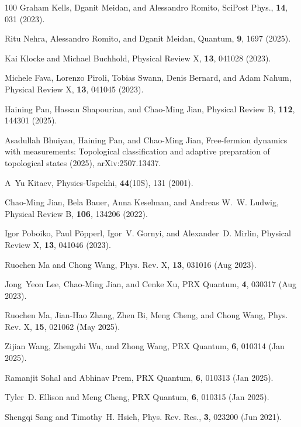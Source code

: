 \documentclass[preprint,pteplogo]{ptephy_v2}%
\numberwithin{equation}{section}
\theoremstyle{definition}
\begin{document}
\begin{thebibliography}{100}
Graham Kells, Dganit Meidan, and Alessandro Romito, SciPost Phys., {\bf 14}, 031 (2023).

Ritu Nehra, Alessandro Romito, and Dganit Meidan, Quantum, {\bf 9}, 1697 (2025).

Kai Klocke and Michael Buchhold, Physical Review X, {\bf 13}, 041028 (2023).

Michele Fava, Lorenzo Piroli, Tobias Swann, Denis Bernard, and Adam Nahum, Physical Review X, {\bf 13}, 041045 (2023).

Haining Pan, Hassan Shapourian, and Chao-Ming Jian, Physical Review B, {\bf 112}, 144301 (2025).

Asadullah Bhuiyan, Haining Pan, and Chao-Ming Jian,
\newblock Free-fermion dynamics with measurements: Topological classification and adaptive preparation of topological states (2025),  {{arXiv:2507.13437}}.

A~Yu Kitaev, Physics-Uspekhi, {\bf 44}(10S), 131 (2001).

Chao-Ming Jian, Bela Bauer, Anna Keselman, and Andreas W.~W. Ludwig, Physical Review B, {\bf 106}, 134206 (2022).

Igor Poboiko, Paul P\"opperl, Igor~V. Gornyi, and Alexander~D. Mirlin, Physical Review X, {\bf 13}, 041046 (2023).

Ruochen Ma and Chong Wang, Phys. Rev. X, {\bf 13}, 031016 (Aug 2023).

Jong~Yeon Lee, Chao-Ming Jian, and Cenke Xu, PRX Quantum, {\bf 4}, 030317 (Aug 2023).

Ruochen Ma, Jian-Hao Zhang, Zhen Bi, Meng Cheng, and Chong Wang, Phys. Rev. X, {\bf 15}, 021062 (May 2025).

Zijian Wang, Zhengzhi Wu, and Zhong Wang, PRX Quantum, {\bf 6}, 010314 (Jan 2025).

Ramanjit Sohal and Abhinav Prem, PRX Quantum, {\bf 6}, 010313 (Jan 2025).

Tyler~D. Ellison and Meng Cheng, PRX Quantum, {\bf 6}, 010315 (Jan 2025).

Shengqi Sang and Timothy~H. Hsieh, Phys. Rev. Res., {\bf 3}, 023200 (Jun 2021).


\end{thebibliography}
\end{document}
